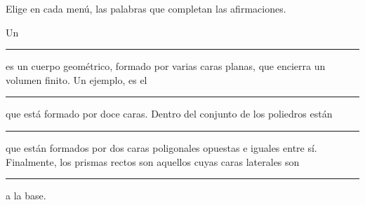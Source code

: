 \question Elige en cada menú, las palabras que completan las afirmaciones.
\begin{center}
     \quad {} \quad {} \quad
     \quad {} \quad {} \quad
     \quad {} \quad {} \quad
     \quad {} \quad {} \quad
\end{center}
Un \rule{2cm}{0.2mm} es un cuerpo geométrico, formado por varias caras planas,
que encierra un volumen finito. Un ejemplo, es el \rule{2cm}{0.2mm}
que está formado por doce caras. Dentro del conjunto de los poliedros están \rule{2cm}{0.2mm}
que están formados por dos caras poligonales opuestas e iguales entre sí.
Finalmente, los prismas rectos son aquellos cuyas caras laterales son
\rule{2cm}{0.2mm} a la base.